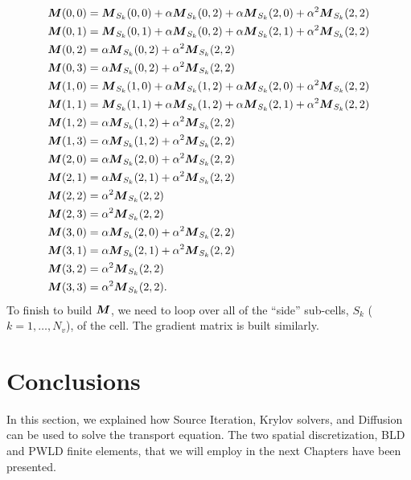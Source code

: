 {\allowdisplaybreaks
\begin{align}
  & \boldsymbol{M}(0,0) =  \boldsymbol{M}_{S_k}(0,0) + \alpha \boldsymbol{M}_{S_k}(0,2) + \alpha
  \boldsymbol{M}_{S_k}(2,0) + \alpha^2 \boldsymbol{M}_{S_k}(2,2)\\
  & \boldsymbol{M}(0,1) =  \boldsymbol{M}_{S_k}(0,1) + \alpha \boldsymbol{M}_{S_k}(0,2) + \alpha
  \boldsymbol{M}_{S_k}(2,1) + \alpha^2 \boldsymbol{M}_{S_k}(2,2)\\
  & \boldsymbol{M}(0,2) =  \alpha \boldsymbol{M}_{S_k}(0,2) + \alpha^2 \boldsymbol{M}_{S_k}(2,2)\\
  & \boldsymbol{M}(0,3) =  \alpha \boldsymbol{M}_{S_k}(0,2) + \alpha^2 \boldsymbol{M}_{S_k}(2,2)\\
  & \boldsymbol{M}(1,0) =  \boldsymbol{M}_{S_k}(1,0) + \alpha \boldsymbol{M}_{S_k}(1,2) + \alpha
  \boldsymbol{M}_{S_k}(2,0) + \alpha^2 \boldsymbol{M}_{S_k}(2,2)\\
  & \boldsymbol{M}(1,1) =  \boldsymbol{M}_{S_k}(1,1) + \alpha \boldsymbol{M}_{S_k}(1,2) + \alpha
  \boldsymbol{M}_{S_k}(2,1) + \alpha^2 \boldsymbol{M}_{S_k}(2,2)\\
  & \boldsymbol{M}(1,2) =  \alpha \boldsymbol{M}_{S_k}(1,2) + \alpha^2 \boldsymbol{M}_{S_k}(2,2)\\
  & \boldsymbol{M}(1,3) =  \alpha \boldsymbol{M}_{S_k}(1,2) + \alpha^2 \boldsymbol{M}_{S_k}(2,2)\\
  & \boldsymbol{M}(2,0) =  \alpha \boldsymbol{M}_{S_k}(2,0) + \alpha^2 \boldsymbol{M}_{S_k}(2,2)\\
  & \boldsymbol{M}(2,1) =  \alpha \boldsymbol{M}_{S_k}(2,1) + \alpha^2 \boldsymbol{M}_{S_k}(2,2)\\
  & \boldsymbol{M}(2,2) =  \alpha^2 \boldsymbol{M}_{S_k}(2,2)\\
  & \boldsymbol{M}(2,3) =  \alpha^2 \boldsymbol{M}_{S_k}(2,2)\\
  & \boldsymbol{M}(3,0) =  \alpha \boldsymbol{M}_{S_k}(2,0) + \alpha^2 \boldsymbol{M}_{S_k}(2,2)\\
  & \boldsymbol{M}(3,1) =  \alpha \boldsymbol{M}_{S_k}(2,1) + \alpha^2 \boldsymbol{M}_{S_k}(2,2)\\
  & \boldsymbol{M}(3,2) =  \alpha^2 \boldsymbol{M}_{S_k}(2,2)\\
  & \boldsymbol{M}(3,3) =  \alpha^2 \boldsymbol{M}_{S_k}(2,2). 
\end{align}}    
To finish to build $\boldsymbol{M}$, we need to loop over all of the ``side''
sub-cells, $S_k$ ($k=1,\hdots,N_v$), of the cell. The gradient matrix is built 
similarly.

\section{Conclusions}
In this section, we explained how Source Iteration, Krylov solvers, and
Diffusion can be used to solve the transport equation. The two spatial
discretization, BLD and PWLD finite elements, that we will employ in the next
Chapters have been presented.
